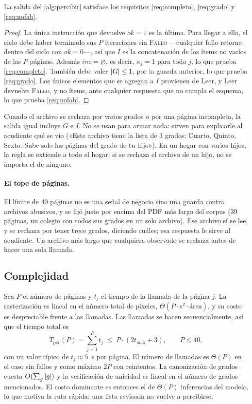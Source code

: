 \begin{proposicion}
\label{prop:percibir}
La salida del \cref{alg:percibir} satisface los requisitos
\ref{req:completo}, \ref{req:grado} y \ref{req:nofab}.
\end{proposicion}

\begin{proof}
La única instrucción que devuelve $\mathit{ok}=1$ es la última. Para llegar a
ella, el ciclo debe haber terminado sus $P$ iteraciones sin \textsc{Fallo}
---cualquier fallo retorna dentro del ciclo con $\mathit{ok}=0$---, así que
$I$ es la concatenación de los ítems no vacíos de las $P$ páginas. Además
$\mathit{inc}=\varnothing$, es decir, $\kappa_j=1$ para todo $j$, lo que
prueba \ref{req:completo}. También debe valer $\left\lvert G \right\rvert\leq1$, por la guarda
anterior, lo que prueba \ref{req:grado}. Los únicos elementos que se agregan a
$I$ provienen de $\mathrm{Leer}$, y $\mathrm{Leer}$ devuelve \textsc{Fallo}, y
no ítems, ante cualquier respuesta que no cumpla el esquema, lo que prueba
\ref{req:nofab}.
\end{proof}

Cuando el archivo se rechaza por varios grados o por una página incompleta,
la salida igual incluye $G$ e $I$. No se usan para armar nada: sirven para
explicarle al acudiente qué se vio («Este archivo tiene la lista de 3 grados:
Cuarto, Quinto, Sexto. Sube solo las páginas del grado de tu hijo»). En un
hogar con varios hijos, la regla se extiende a todo el hogar: si se rechaza el
archivo de un hijo, no se importa el de ninguno.

\paragraph{El tope de páginas.} El límite de 40 páginas no es una señal de
negocio sino una guarda contra archivos abusivos, y se fijó justo por encima
del PDF más largo del corpus (39 páginas, un colegio con todos sus grados en
un solo archivo). Ese archivo sí se lee, y se rechaza por tener trece grados,
diciendo cuáles; esa respuesta le sirve al acudiente. Un archivo más largo que
cualquiera observado se rechaza antes de hacer una sola llamada.

\subsection{Complejidad}

Sea $P$ el número de páginas y $t_j$ el tiempo de la llamada de la página $j$.
La rasterización es lineal en el número total de píxeles,
$\Theta(P\cdot s^2\cdot \mathrm{área})$, y su costo es despreciable frente a
las llamadas. Las llamadas se hacen secuencialmente, así que el tiempo total
es
\[
  T_{\mathrm{per}}(P) = \sum_{j=1}^{P} t_j \;\leq\; P\cdot(2t_{\max}+3),
  \qquad P\leq 40,
\]
con un valor típico de $t_j\approx 5$~s por página. El número de llamadas es
$\Theta(P)$ en el caso sin fallos y como máximo $2P$ con reintentos. La
canonización de grados cuesta $O(\sum_g\left\lvert g \right\rvert)$ y la verificación de
unicidad es lineal en el número de grados mencionados. El costo dominante es
entonces el de $\Theta(P)$ inferencias del modelo, lo que motiva la ruta
rápida: una lista revisada no vuelve a percibirse.

